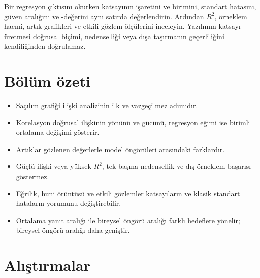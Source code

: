\begin{outputguidebox}
Bir regresyon çıktısını okurken katsayının işaretini ve birimini, standart
hatasını, güven aralığını ve \pval-değerini aynı satırda değerlendirin. Ardından
$R^2$, örneklem hacmi, artık grafikleri ve etkili gözlem ölçülerini inceleyin.
Yazılımın katsayı üretmesi doğrusal biçimi, nedenselliği veya dışa taşırmanın
geçerliliğini kendiliğinden doğrulamaz.
\end{outputguidebox}





\section{Bölüm özeti}

\begin{itemize}
  \item Saçılım grafiği ilişki analizinin ilk ve vazgeçilmez adımıdır.
  \item Korelasyon doğrusal ilişkinin yönünü ve gücünü, regresyon eğimi ise birimli ortalama değişimi gösterir.
  \item Artıklar gözlenen değerlerle model öngörüleri arasındaki farklardır.
  \item Güçlü ilişki veya yüksek $R^2$, tek başına nedensellik ve dış örneklem başarısı göstermez.
  \item Eğrilik, huni örüntüsü ve etkili gözlemler katsayıların ve klasik
  standart hataların yorumunu değiştirebilir.
  \item Ortalama yanıt aralığı ile bireysel öngörü aralığı farklı hedeflere
  yönelir; bireysel öngörü aralığı daha geniştir.
\end{itemize}

\section*{Alıştırmalar}

